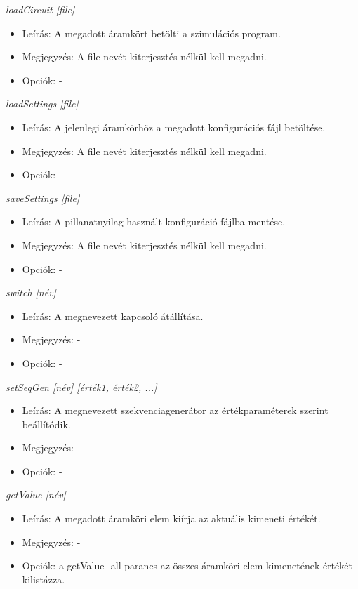 \textit{loadCircuit [file]}
\begin{itemize}
	\item Leírás: A megadott áramkört betölti a szimulációs program.
	\item Megjegyzés: A file nevét kiterjesztés nélkül kell megadni.
	\item Opciók: -
\end{itemize}

\textit{loadSettings [file]}
\begin{itemize}
	\item Leírás: A jelenlegi áramkörhöz a megadott konfigurációs fájl betöltése.
	\item Megjegyzés: A file nevét kiterjesztés nélkül kell megadni.
	\item Opciók: -
\end{itemize}

\textit{saveSettings [file]}
\begin{itemize}
	\item Leírás: A pillanatnyilag használt konfiguráció fájlba mentése.
	\item Megjegyzés: A file nevét kiterjesztés nélkül kell megadni.
	\item Opciók: -
\end{itemize}

\textit{switch [név]}
\begin{itemize}
	\item Leírás: A megnevezett kapcsoló átállítása.
	\item Megjegyzés: -
	\item Opciók: -
\end{itemize}

\textit{setSeqGen [név] [érték1, érték2, ...]}
\begin{itemize}
	\item Leírás: A megnevezett szekvenciagenerátor az értékparaméterek szerint beállítódik.
	\item Megjegyzés: -
	\item Opciók: -
\end{itemize}

\textit{getValue [név]}
\begin{itemize}
	\item Leírás: A megadott áramköri elem kiírja az aktuális kimeneti értékét.
	\item Megjegyzés: -
	\item Opciók: a getValue -all parancs az összes áramköri elem kimenetének értékét kilistázza.
\end{itemize}

